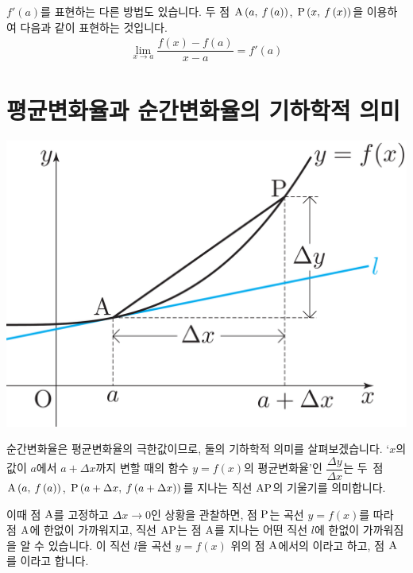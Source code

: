 $f'\left( a \right) $를 표현하는 다른 방법도 있습니다. 두 점 $\xy[A]{a}{f\left( a \right)}$, $\xy[P]{x}{f\left( x \right) }$을 이용하여 다음과 같이 표현하는 것입니다.
\begin{align*} \lim_{x \to a} \dfrac{f\left( x \right) - f\left( a \right)  }{x - a} = f'\left( a \right) \end{align*}
\clearpage
\section{평균변화율과 순간변화율의 기하학적 의미}
\begin{center} \includegraphics[scale=\pgfkeysvalueof{picsize}]{DBs/pic/zerr_01.pdf}\\
	\end{center}순간변화율은 평균변화율의 극한값이므로, 둘의 기하학적 의미를 살펴보겠습니다. `$x$의 값이 $a$에서 $a+ \Delta x$까지 변할 때의 함수 $y=f\left( x \right) $의 평균변화율'인 $\dfrac{\Delta y}{\Delta x}$는 \mbox{두 점 $\xy[A]{a}{f\left( a \right) }$,} $\xy[P]{a+\Delta x}{f\left( a+\Delta x \right) }$를 지나는 직선 $\mrm{AP}$의 기울기를 의미합니다. 

이때 점 $\mrm{A}$를 고정하고 $\Delta x \to 0$인 상황을 관찰하면, 점 $\mrm{P}$는 곡선 $y=f\left( x \right) $를 따라 점 $\mrm{A}$에 한없이 가까워지고, 직선 $\mrm{AP}$는 점 $\mrm{A}$를 지나는 어떤 직선 $l$에 한없이 가까워짐을  알 수 있습니다. 이 직선 $l$을 곡선 $y=f\left( x \right) $ 위의 점 $\mrm{A}$에서의 이라고 하고, 점 $\mrm{A}$를 이라고 합니다.

